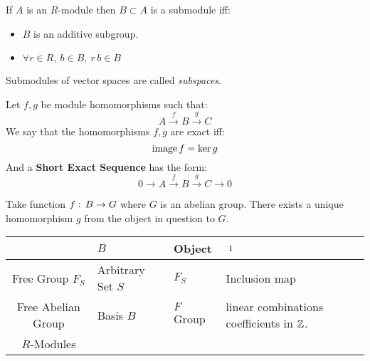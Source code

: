 \begin{ddef}[Submodules]
    If $A$ is an $R$-module then $B\subset A$ is a submodule iff:
    \begin{itemize}
        \item $B$ is an additive subgroup.
        \item $\forall r\in R,\ b\in B,\ r\,b\in B$
    \end{itemize}
    Submodules of vector spaces are called \emph{subspaces}.
\end{ddef}

\begin{ddef}
    Let $f,g$ be module homomorphisms such that:
    $$A\xrightarrow{f} B \xrightarrow{g} C$$
    We say that the homomorphisms $f,g$ are exact iff:
    $$\operatorname{image} f = \ker g$$
    And a \textbf{Short Exact Sequence} has the form:
    $$0\to A\xrightarrow{f} B \xrightarrow{g} C\to 0$$
\end{ddef}

\begin{remarks}
    Take function $f:\, B\to G$ where $G$ is an abelian group. There exists a unique homomorphism $g$ from the object in question to $G$.
    \begin{center}
        \begin{tabular}{|c|l|l|p{3cm}|}
        \hline
                            & $B$ & Object & $\imath$ \\
        \hline
    Free Group $F_S$ & Arbitrary Set $S$ & $F_S$ & Inclusion map \\
        \hline
    Free Abelian Group & Basis $B$ & $F$ Group & linear combinations coefficients in $\mathbb{Z}$. \\
        \hline
        $R$-Modules & && \\ 
            \hline
    \end{tabular}
\end{center}
\end{remarks}
